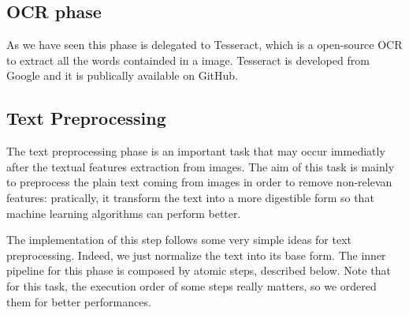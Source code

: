 \documentclass[10pt,twocolumn,letterpaper]{article}
\begin{document}
\subsection{OCR phase}
As we have seen this phase is delegated to Tesseract, which is a open-source OCR to extract all the words containded in a image. Tesseract is developed from Google and it is publically available on GitHub. 

\subsection{Text Preprocessing}

The text preprocessing phase is an important task that may occur
immediatly after the textual features extraction from images. The aim
of this task is mainly to preprocess the plain text coming from images
in order to remove non-relevan features: pratically, it transform the
text into a more digestible form so that machine learning algorithms
can perform better.

The implementation of this step follows some very simple ideas for
text preprocessing. Indeed, we just normalize the text into its base
form. The inner pipeline for this phase is composed by atomic steps,
described below. Note that for this task, the execution order of some
steps really matters, so we ordered them for better performances.
\end{document}
